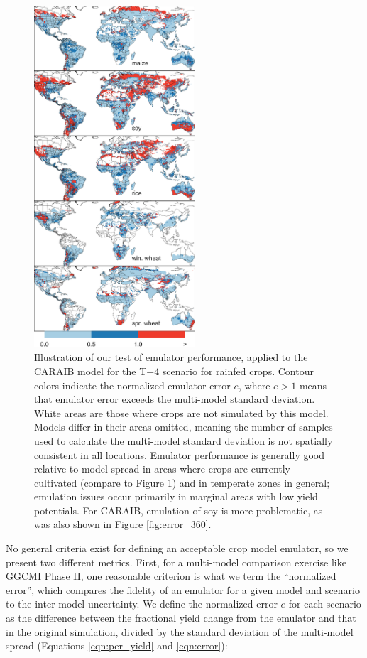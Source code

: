 \documentclass[gmd, manuscript]{copernicus} %
\begin{document}
\begin{figure}[ht]
\centering
    \includegraphics[width=6cm]{figures/em_err.png}
    \caption{Illustration of our test of emulator performance, applied to the CARAIB model for the T+4 scenario for rainfed crops. 
    Contour colors indicate the normalized emulator error $e$, where $e > 1$ means that emulator error exceeds the multi-model standard deviation. 
    White areas are those where crops are not simulated by this model. 
    Models differ in their areas omitted, meaning the number of samples used to calculate the multi-model standard deviation is not spatially consistent in all locations. 
    Emulator performance is generally good relative to model spread in areas where crops are currently cultivated (compare to Figure 1) and in temperate zones in general; emulation issues occur primarily in marginal areas with low yield potentials. 
    For CARAIB, emulation of soy is more problematic, as was also shown in Figure \ref{fig:error_360}.}
   \label{fig:error}
\end{figure}

No general criteria exist for defining an acceptable crop model emulator, so we present two different metrics. 
First, for a multi-model comparison exercise like GGCMI Phase II, one reasonable criterion is what we term the ``normalized error'', which compares the fidelity of an emulator for a given model and scenario to the inter-model uncertainty. 
We define the normalized error $e$ for each scenario as the difference between the fractional yield change from the emulator and that in the original simulation, divided by the standard deviation of the multi-model spread (Equations \ref{eqn:per_yield} and  \ref{eqn:error}):
\end{document}
